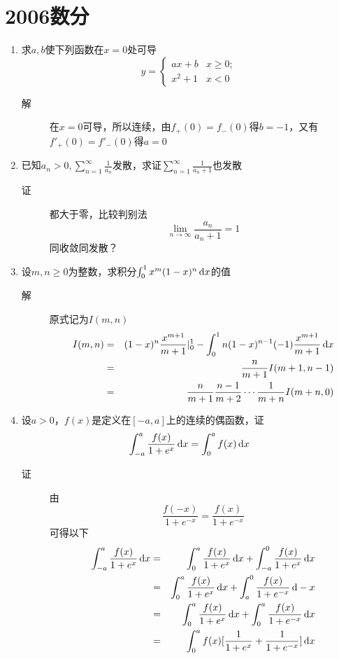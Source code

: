 \section{2006数分}
\begin{enumerate}

\item 求$a,b$使下列函数在$x=0$处可导
\[
y=\begin{cases}
ax+b & x\geq 0;\\
x^2+1 & x<0
\end{cases}
\]
\begin{description}
\item[解] 在$x=0$可导，所以连续，由$f_+(0)=f_-(0)$得$b=-1$，又有$f'_+(0)=f'_-(0)$得$a=0$
\end{description}

\item 已知$a_n>0,\sum_{n=1}^{\infty}\frac{1}{a_n}$发散，求证$\sum_{n=1}^{\infty}\frac{1}{a_n+1}$也发散
\begin{description}
\item[证] 都大于零，比较判别法
\[
\lim_{n\to \infty} \frac{a_n}{a_n+1}=1
\]
同收敛同发散？
\end{description}

\item 设$m,n\geq 0$为整数，求积分$\int_0^1 x^m(1-x)^n \,\mathrm{d} x$的值
\begin{description}
\item[解] 原式记为$I(m,n)$
\begin{eqnarray*}
I(m,n) &= & (1-x)^n\frac{x^{m+1}}{m+1}|_0^1-\int_0^1n(1-x)^{n-1}(-1)\frac{x^{m+1}}{m+1}\,\mathrm{d} x\\
&= & \frac{n}{m+1}I(m+1,n-1)\\
&=&\frac{n}{m+1}\frac{n-1}{m+2}\cdots\frac{1}{m+n}I(m+n,0)
\end{eqnarray*}
\end{description}

\item 设$a > 0$，$f(x)$是定义在$[-a,a]$上的连续的偶函数，证
\[
\int_{-a}^a\frac{f(x)}{1+e^x}\,\mathrm{d} x =\int_0^a f(x)\,\mathrm{d} x
\]
\begin{description}
\item[证] 由
\[
\frac{f(-x)}{1+e^{-x}} = \frac{f(x)}{1+e^{-x}}
\]
可得以下
\begin{eqnarray*}
\int_{-a}^a\frac{f(x)}{1+e^x}\,\mathrm{d} x &=& \int_{0}^a\frac{f(x)}{1+e^x}\,\mathrm{d} x +\int_{-a}^0\frac{f(x)}{1+e^x}\,\mathrm{d} x \\
& = & \int_{0}^a\frac{f(x)}{1+e^x}\,\mathrm{d} x + \int_{a}^0\frac{f(x)}{1+e^{-x}}\,\mathrm{d} -x \\
& = & \int_{0}^a\frac{f(x)}{1+e^x}\,\mathrm{d} x + \int_{0}^a\frac{f(x)}{1+e^{-x}}\,\mathrm{d} x \\
& = & \int_{0}^af(x)[\frac{1}{1+e^x}+\frac{1}{1+e^{-x}}]\,\mathrm{d} x
\end{eqnarray*}
\end{description}


\end{enumerate}
